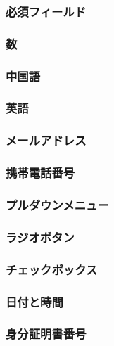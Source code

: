 
\subsubsection{必須フィールド}

\subsubsection{数}

\subsubsection{中国語}

\subsubsection{英語}

\subsubsection{メールアドレス}

\subsubsection{携帯電話番号}

\subsubsection{プルダウンメニュー}

\subsubsection{ラジオボタン}

\subsubsection{チェックボックス}

\subsubsection{日付と時間}

\subsubsection{身分証明書番号}

